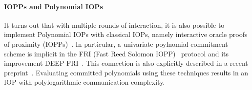 




\paragraph{IOPPs and Polynomial IOPs} It turns out that with multiple rounds of interaction, it is also possible to implement Polynomial IOPs with classical IOPs, namely interactive oracle proofs of proximity (IOPPs)~\cite{STOC:ReiRotRot16,TCC:BenChiSpo16}. In particular, a univariate poylnomial commitment scheme is implicit in the FRI (Fast Reed Solomon IOPP)~\cite{ICALP:BBHR18} protocol and its improvement DEEP-FRI~\cite{ECCC:BGKS19}. This connection is also explicitly described in a recent preprint~\cite{MatterLabs}. Evaluating committed polynomials using these techniques results in an IOP with polylogarithmic communication complexity.\\


